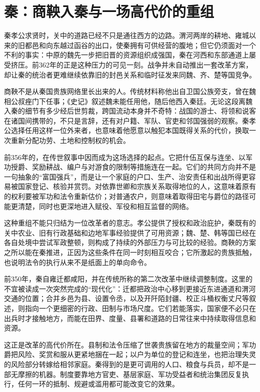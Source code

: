 \section{秦：商鞅入秦与一场高代价的重组}

秦孝公求贤时，关中的道路已经不只是通往西方的边路。渭河两岸的耕地、雍城以来的旧都邑和向东越过函谷的出口，使秦拥有可供经营的腹地；但它仍须面对一个不利的事实：中原的魏先一步把旧晋的资源组织成强国，秦在河西和东部通道上屡受挤压。前362年的正是这种压力的可见一刻。战争并未自动推出一套改革方案，却让秦的统治者更难继续依靠旧的封邑关系和临时征发来同魏、齐、楚等国竞争。

商鞅不是从秦国贵族网络里长出来的人。传统材料称他出自卫国公族旁支，曾在魏相公叔痤门下任事；《史记》叙述魏未能任用他，随后他西入秦廷。无论这段离魏入秦的细节有多少经后世剪裁，跨国流动本身并不奇特：战国的游士、将领和说客在诸国间携带的，不只是言辞，还有对户籍、军队、官吏和邻国强弱的观察。秦孝公选择任用这样一位外来者，也意味着他愿意以触犯本国既得关系的代价，换取一次重新分配功劳、土地和控制权的机会。

前356年的，在传世叙事中因而成为这场选择的起点。它把什伍互保与连坐、以军功授爵、奖励耕战、编户与对游食的限制等措施连在一起。它们的共同方向并不是一句抽象的“富国强兵”，而是让一个家庭的户口、生产、治安责任和出战所得更容易被国家登记、核验并赏罚。对依靠世卿和宗族关系取得地位的人，这意味着原有的权利要被军功和法令重新估价；对普通农户，则意味着取得田宅与爵位的路径可能更清楚，同时也更深地进入赋役、军役和相互监督的网络。

这种重组不能只归结为一位改革者的意志。孝公提供了授权和政治庇护，秦既有的关中农业、旧有行政基础和边地军事经验提供了可用资源；魏、楚、韩等国已经在各自处境中尝试军政整顿，则构成了持续的外部压力与可比较的经验。商鞅的方案之所以能在秦推进，正因为这些条件在同一时刻相互咬合；它所激起的贵族抵触，也说明法令的执行从来不是纸面上的单向命令。

前350年，秦自雍迁都咸阳，并在传统所称的第二次改革中继续调整制度。这里的不宜被读成一次突然完成的“现代化”：迁都把政治中心移到更接近东进通道和渭河交通的位置；合并乡邑为县、设置令丞，以及开阡陌封疆、校正斗桶权衡丈尺等叙述，则指向一个更细密的行政、田制与市场尺度。它们若能落实，国家便不必只在出兵时才接触地方，而能在田界、度量、县署和道路的日常往来中持续取得信息和资源。

这正是改革的高代价所在。县制和法令压缩了世袭贵族留在地方的裁量空间；军功爵把风险、奖赏和服从更紧地捆在一起；以户为单位的登记和连坐，也把治理失灵的风险部分转嫁给相邻家庭。秦得到的是更可调用的人口、粮食与兵员，却不是一部无摩擦的机器。制度要靠地方官吏、基层家庭、军功受益者和统治集团反复执行，任何一环的抵制、规避或滥用都可能改变它的效果。

